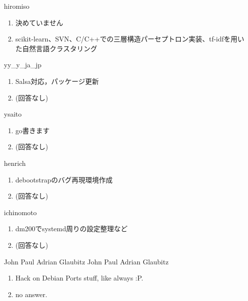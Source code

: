 \begin{prework}{ hiromiso }
  \begin{enumerate}
  \item 決めていません
  \item scikit-learn、SVN、C/C++での三層構造パーセプトロン実装、tf-idfを用いた自然言語クラスタリング
  \end{enumerate}
\end{prework}

\begin{prework}{ yy\_y\_ja\_jp }
  \begin{enumerate}
  \item Salsa対応，パッケージ更新
  \item (回答なし)
  \end{enumerate}
\end{prework}

\begin{prework}{ ysaito }
  \begin{enumerate}
  \item go書きます
  \item (回答なし)
  \end{enumerate}
\end{prework}

\begin{prework}{ henrich }
  \begin{enumerate}
  \item debootstrapのバグ再現環境作成
  \item (回答なし)
  \end{enumerate}
\end{prework}

\begin{prework}{ ichinomoto }
  \begin{enumerate}
  \item dm200でsystemd周りの設定整理など
  \item (回答なし)
  \end{enumerate}
\end{prework}

\begin{prework}{ John Paul Adrian Glaubitz John Paul Adrian Glaubitz }
  \begin{enumerate}
  \item Hack on Debian Ports stuff, like always :P.
  \item no answer.
  \end{enumerate}
\end{prework}

